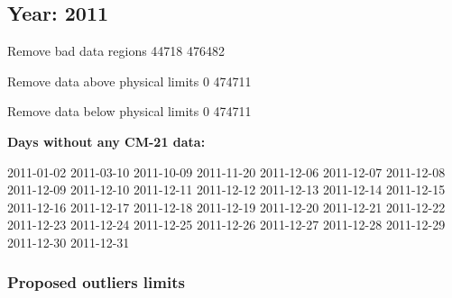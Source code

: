 \documentclass[
  10pt,
  a4paper,oneside]{article}
\begin{document}
\FloatBarrier

\newpage

\hypertarget{year-2011}{%
\subsection{Year: 2011}\label{year-2011}}

Remove bad data regions
44718 476482

Remove data above physical limits
0 474711

Remove data below physical limits
0 474711

\textbf{Days without any CM-21 data:}

2011-01-02 2011-03-10 2011-10-09 2011-11-20 2011-12-06 2011-12-07 2011-12-08 2011-12-09 2011-12-10 2011-12-11 2011-12-12 2011-12-13 2011-12-14 2011-12-15 2011-12-16 2011-12-17 2011-12-18 2011-12-19 2011-12-20 2011-12-21 2011-12-22 2011-12-23 2011-12-24 2011-12-25 2011-12-26 2011-12-27 2011-12-28 2011-12-29 2011-12-30 2011-12-31

\hypertarget{proposed-outliers-limits-18}{%
\subsubsection{Proposed outliers limits}\label{proposed-outliers-limits-18}}

\footnotesize
\end{document}
